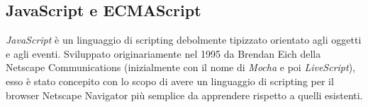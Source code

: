 \subsection{JavaScript e ECMAScript}

  \emph{JavaScript} è un linguaggio di scripting debolmente tipizzato orientato agli oggetti e agli eventi.
  Sviluppato originariamente nel 1995 da Brendan Eich della Netscape Communications (inizialmente con il nome di \emph{Mocha} e poi \emph{LiveScript}),
  esso è stato concepito con lo scopo di avere un linguaggio di scripting per il browser Netscape Navigator più semplice da apprendere rispetto a quelli esistenti.


